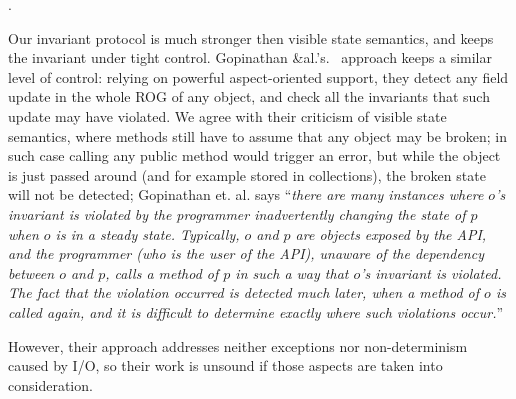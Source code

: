 .

Our invariant protocol is much stronger then
visible state semantics, and keeps the invariant under tight control.
Gopinathan \&al.'s.~\cite{Gopinathan:2008:RMO:1483018.1483028} approach keeps
a similar level of control:
relying on powerful aspect-oriented support, they detect any field update in the whole ROG of any object, and check all the invariants that such update may have violated.
We agree with their criticism of visible state semantics, where  methods still have to assume that any object may be broken; in such case calling any public method would trigger an error, but while the object is just passed around (and for example stored in collections), the broken state will not be detected; Gopinathan et. al. says ``\emph{there are many instances where $o$'s invariant is violated by the programmer inadvertently changing the state of $p$ when $o$ is in a steady state. Typically, $o$ and $p$ are objects exposed by the API, and the programmer (who is the user of the API), unaware of the dependency between $o$ and $p$, calls a method of $p$ in such a way that $o$'s invariant is violated. The fact that the violation occurred is detected much later, when a method of $o$ is called again, and it is difficult to determine exactly where such violations occur.}''

However, their approach addresses neither exceptions nor non-determinism caused by I/O, so their work is unsound if those aspects are taken into consideration.

